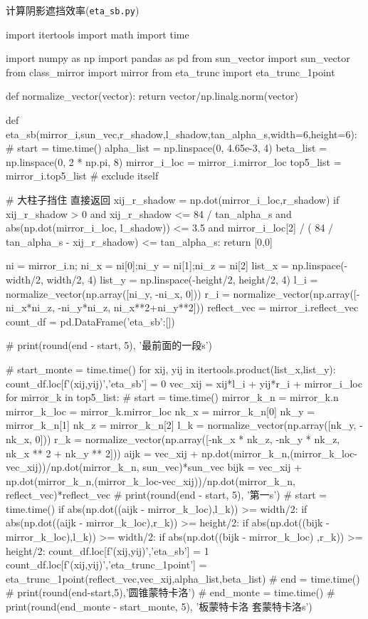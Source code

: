 \documentclass{article}
\numberwithin{equation}{subsection}
\begin{document}
计算阴影遮挡效率(\verb|eta_sb.py|)
\begin{python}
import itertools
import math
import time

import numpy as np
import pandas as pd
from sun_vector import sun_vector
from class_mirror import mirror
from eta_trunc import eta_trunc_1point


def normalize_vector(vector):
    return vector/np.linalg.norm(vector)

def eta_sb(mirror_i,sun_vec,r_shadow,l_shadow,tan_alpha_s,width=6,height=6):
    # start = time.time()
    alpha_list = np.linspace(0, 4.65e-3, 4)
    beta_list = np.linspace(0, 2 * np.pi, 8)
    mirror_i_loc = mirror_i.mirror_loc
    top5_list = mirror_i.top5_list       # exclude itself

    # 大柱子挡住 直接返回
    xij_r_shadow = np.dot(mirror_i_loc,r_shadow)
    if xij_r_shadow > 0 and xij_r_shadow <= 84 / tan_alpha_s and abs(np.dot(mirror_i_loc, l_shadow)) <= 3.5 and mirror_i_loc[2] / (
            84 / tan_alpha_s - xij_r_shadow) <= tan_alpha_s:
        return [0,0]

    ni = mirror_i.n; ni_x = ni[0];ni_y = ni[1];ni_z = ni[2]
    list_x = np.linspace(-width/2, width/2, 4)
    list_y = np.linspace(-height/2, height/2, 4)
    l_i = normalize_vector(np.array([ni_y, -ni_x, 0]))
    r_i = normalize_vector(np.array([-ni_x*ni_z, -ni_y*ni_z, ni_x**2+ni_y**2]))
    reflect_vec = mirror_i.reflect_vec
    count_df = pd.DataFrame({'eta_sb':[]})

    # print(round(end - start, 5), '最前面的一段s')

    # start_monte = time.time()
    for xij, yij in itertools.product(list_x,list_y):
        count_df.loc[f'({xij},{yij})','eta_sb'] = 0
        vec_xij = xij*l_i + yij*r_i + mirror_i_loc
        for mirror_k in top5_list:
            # start = time.time()
            mirror_k_n = mirror_k.n
            mirror_k_loc = mirror_k.mirror_loc
            nk_x = mirror_k_n[0]
            nk_y = mirror_k_n[1]
            nk_z = mirror_k_n[2]
            l_k = normalize_vector(np.array([nk_y, -nk_x, 0]))
            r_k = normalize_vector(np.array([-nk_x * nk_z, -nk_y * nk_z, nk_x ** 2 + nk_y ** 2]))
            aijk = vec_xij + np.dot(mirror_k_n,(mirror_k_loc-vec_xij))/np.dot(mirror_k_n, sun_vec)*sun_vec
            bijk = vec_xij + np.dot(mirror_k_n,(mirror_k_loc-vec_xij))/np.dot(mirror_k_n, reflect_vec)*reflect_vec
            # print(round(end - start, 5), '第一s')
            # start = time.time()
            if abs(np.dot((aijk - mirror_k_loc),l_k)) >= width/2:
                if abs(np.dot((aijk - mirror_k_loc),r_k)) >= height/2:
                    if abs(np.dot((bijk - mirror_k_loc),l_k)) >= width/2:
                        if abs(np.dot((bijk - mirror_k_loc) ,r_k)) >= height/2:
                            count_df.loc[f'({xij},{yij})','eta_sb'] = 1
                            count_df.loc[f'({xij},{yij})','eta_trunc_1point'] = eta_trunc_1point(reflect_vec,vec_xij,alpha_list,beta_list)
            # end = time.time()
            # print(round(end-start,5),'圆锥蒙特卡洛')
    # end_monte = time.time()
    # print(round(end_monte - start_monte, 5), '板蒙特卡洛 套蒙特卡洛s')


\end{python}
\end{document}
